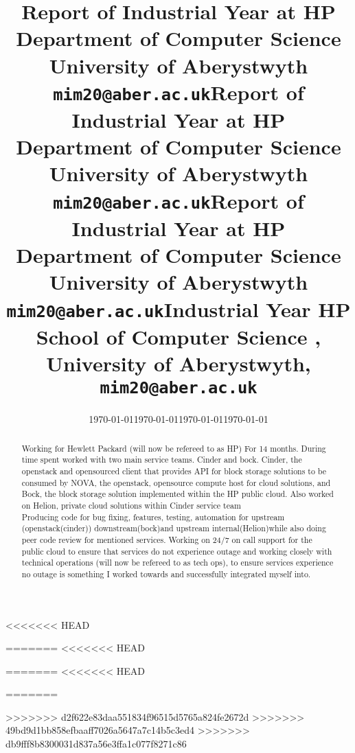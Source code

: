 \documentclass[11pt,a4paper]{report}
\begin{document}
<<<<<<< HEAD
\title{Report of Industrial Year at HP\\Department of Computer Science\\ University of Aberystwyth\\ \texttt{mim20@aber.ac.uk}} \date{\today}
=======
<<<<<<< HEAD
\title{Report of Industrial Year at HP\\Department of Computer Science\\ University of Aberystwyth\\ \texttt{mim20@aber.ac.uk}} \date{\today}
=======
<<<<<<< HEAD
\title{Report of Industrial Year at HP\\Department of Computer Science\\ University of Aberystwyth\\ \texttt{mim20@aber.ac.uk}} \date{\today}
=======
\title{Industrial Year HP School of Computer Science ,\\ University of Aberystwyth,\\ \texttt{mim20@aber.ac.uk}} \date{\today}
>>>>>>> d2f622e83daa551834f96515d5765a824fe2672d
>>>>>>> 49bd9d1bb858efbaaff7026a5647a7c14b5c3ed4
>>>>>>> db9fff8b8300031d837a56e3ffa1c077f8271c86
\maketitle

\begin{abstract} 

Working for Hewlett Packard (will now be refereed to as HP) For 14 months. During time spent worked with two main service teams. Cinder and bock. Cinder, the openstack and opensourced client that provides API for block storage solutions to be consumed by NOVA, the openstack, opensource compute host for cloud solutions, and Bock, the block storage solution implemented within the HP public cloud. Also worked on Helion, private cloud solutions within Cinder service team\\ 
Producing code for bug fixing, features, testing, automation for upstream (openstack(cinder)) downstream(bock)and upstream internal(Helion)while also doing peer code review for mentioned services. 
Working on 24/7 on call support for the public cloud to ensure that services do not experience outage and working closely with technical operations (will now be refereed to as tech ops), to ensure services experience no outage is something I worked towards and successfully integrated myself into.

\end{abstract}
\end{document}
